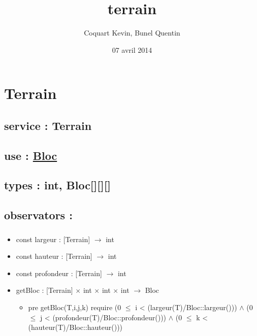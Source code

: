 \documentclass[11pt]{article}
\title{terrain}
\author{Coquart Kevin, Bunel Quentin}
\date{07 avril 2014}
\begin{document}
\maketitle

\setcounter{tocdepth}{3}
\tableofcontents
\vspace*{1cm}
\section{Terrain}
\label{sec-1}

\subsection{service : Terrain}
\label{sec-1.1}

\subsection{use : \href{file:///users/Etu5/3000675/Desktop/spec/bloc.org}{Bloc}}
\label{sec-1.2}

\subsection{types : int, Bloc[][][]}
\label{sec-1.3}



\subsection{observators :}
\label{sec-1.4}

\subsubsection{}

\begin{itemize}

\item const largeur : [Terrain] $\to$ int\\
\label{sec-1.4.1.1}


\item const hauteur : [Terrain] $\to$ int\\
\label{sec-1.4.1.2}


\item const profondeur : [Terrain] $\to$ int\\
\label{sec-1.4.1.3}


\item getBloc : [Terrain] $\times$ int $\times$ int $\times$ int $\to$ Bloc\\
\label{sec-1.4.1.4}

\begin{itemize}

\item pre getBloc(T,i,j,k) require (0 $\leqslant$ i < (largeur(T)/Bloc::largeur())) $\wedge$ (0 $\leqslant$ j < (profondeur(T)/Bloc::profondeur())) $\wedge$ (0 $\leqslant$ k < (hauteur(T)/Bloc::hauteur()))\\
\label{sec-1.4.1.4.1}


\end{itemize} %
\end{itemize} %
\end{document}
